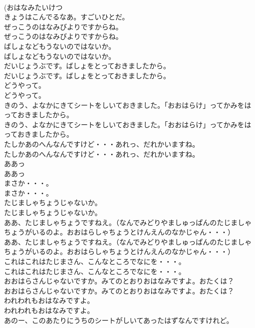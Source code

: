 \documentclass[8pt]{extreport}
\begin{document}
\begin{CJK}{UTF8}{min}
\\	(おはなみたいけつ 
\\	きょうはこんでるなあ。すごいひとだ。
\\	ぜっこうのはなみびよりですからね。
\\	ぜっこうのはなみびよりですからね。
\\	ばしょなどもうないのではないか。
\\	ばしょなどもうないのではないか。
\\	だいじょうぶです。ばしょをとっておきましたから。
\\	だいじょうぶです。ばしょをとっておきましたから。
\\	どうやって。
\\	どうやって。
\\	きのう、よなかにきてシートをしいておきました。「おおはらけ」ってかみをはっておきましたから。
\\	きのう、よなかにきてシートをしいておきました。「おおはらけ」ってかみをはっておきましたから。
\\	たしかあのへんなんですけど・・・あれっ、だれかいますね。
\\	たしかあのへんなんですけど・・・あれっ、だれかいますね。
\\	ああっ
\\	ああっ
\\	まさか・・・。
\\	まさか・・・。
\\	たじましゃちょうじゃないか。
\\	たじましゃちょうじゃないか。
\\	ああ、たじましゃちょうですねえ。（なんでみどりやましゅっぱんのたじましゃちょうがいるのよ。おおはらしゃちょうとけんえんのなかじゃん・・・）
\\	ああ、たじましゃちょうですねえ。（なんでみどりやましゅっぱんのたじましゃちょうがいるのよ。おおはらしゃちょうとけんえんのなかじゃん・・・）
\\	これはこれはたじまさん、こんなところでなにを・・・。
\\	これはこれはたじまさん、こんなところでなにを・・・。
\\	おおはらさんじゃないですか。みてのとおりおはなみですよ。おたくは？
\\	おおはらさんじゃないですか。みてのとおりおはなみですよ。おたくは？
\\	われわれもおはなみですよ。
\\	われわれもおはなみですよ。
\\	あのー、このあたりにうちのシートがしいてあったはずなんですけれど。

\end{CJK}
\end{document}
